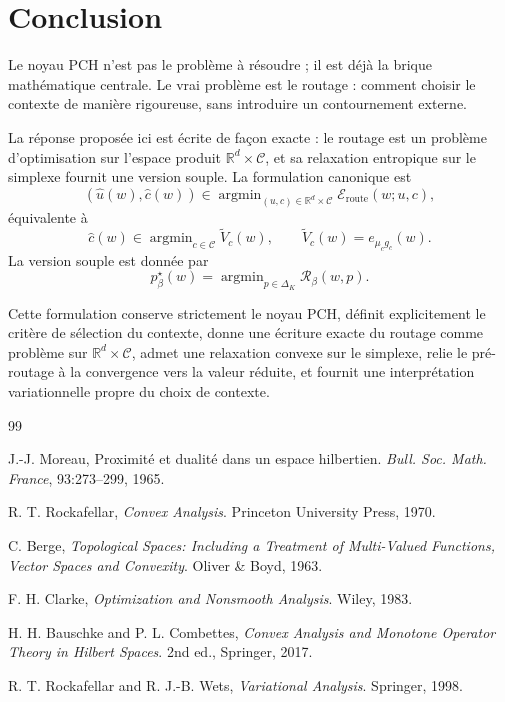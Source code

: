 \documentclass[11pt,a4paper]{article}
\DeclareMathOperator{\argmin}{argmin}
\newcommand{\R}{\mathbb R}
\newcommand{\Ccal}{\mathcal C}
\newcommand{\Rcal}{\mathcal R}
\begin{document}
\section{Conclusion}

Le noyau PCH n'est pas le problème à résoudre ; il est déjà la brique mathématique centrale. Le vrai problème est le routage : comment choisir le contexte de manière rigoureuse, sans introduire un contournement externe.

La réponse proposée ici est écrite de façon exacte : le routage est un problème d'optimisation sur l'espace produit \(\R^d\times\Ccal\), et sa relaxation entropique sur le simplexe fournit une version souple. La formulation canonique est
\[
(\hat u(w),\hat c(w))\in\argmin_{(u,c)\in\R^d\times\Ccal}\mathcal E_{\mathrm{route}}(w;u,c),
\]
équivalente à
\[
\hat c(w)\in\argmin_{c\in\Ccal}\widetilde V_c(w),
\qquad
\widetilde V_c(w)=e_{\mu_c g_c}(w).
\]
La version souple est donnée par
\[
p^\star_\beta(w)=\argmin_{p\in\Delta_K}\Rcal_\beta(w,p).
\]

Cette formulation conserve strictement le noyau PCH, définit explicitement le critère de sélection du contexte, donne une écriture exacte du routage comme problème sur \(\R^d\times\Ccal\), admet une relaxation convexe sur le simplexe, relie le pré-routage à la convergence vers la valeur réduite, et fournit une interprétation variationnelle propre du choix de contexte.

\begin{thebibliography}{99}

J.-J. Moreau,
\newblock Proximité et dualité dans un espace hilbertien.
\newblock \emph{Bull. Soc. Math. France}, 93:273--299, 1965.

R. T. Rockafellar,
\newblock \emph{Convex Analysis}.
\newblock Princeton University Press, 1970.

C. Berge,
\newblock \emph{Topological Spaces: Including a Treatment of Multi-Valued Functions, Vector Spaces and Convexity}.
\newblock Oliver \& Boyd, 1963.

F. H. Clarke,
\newblock \emph{Optimization and Nonsmooth Analysis}.
\newblock Wiley, 1983.

H. H. Bauschke and P. L. Combettes,
\newblock \emph{Convex Analysis and Monotone Operator Theory in Hilbert Spaces}.
\newblock 2nd ed., Springer, 2017.

R. T. Rockafellar and R. J.-B. Wets,
\newblock \emph{Variational Analysis}.
\newblock Springer, 1998.

\end{thebibliography}
\end{document}
